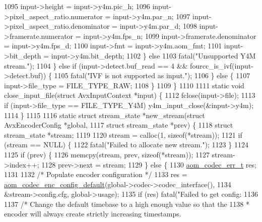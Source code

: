 \begin{DoxyCodeInclude}
{{{{{{{{{{{{{{{1095       input->height = input->y4m.pic\_h;
1096       input->pixel\_aspect\_ratio.numerator = input->y4m.par\_n;
1097       input->pixel\_aspect\_ratio.denominator = input->y4m.par\_d;
1098       input->framerate.numerator = input->y4m.fps\_n;
1099       input->framerate.denominator = input->y4m.fps\_d;
1100       input->fmt = input->y4m.aom\_fmt;
1101       input->bit\_depth = input->y4m.bit\_depth;
1102     \} \textcolor{keywordflow}{else}
1103       fatal(\textcolor{stringliteral}{"Unsupported Y4M stream."});
1104   \} \textcolor{keywordflow}{else} \textcolor{keywordflow}{if} (input->detect.buf\_read == 4 && fourcc\_is\_ivf(input->detect.buf)) \{
1105     fatal(\textcolor{stringliteral}{"IVF is not supported as input."});
1106   \} \textcolor{keywordflow}{else} \{
1107     input->file\_type = FILE\_TYPE\_RAW;
1108   \}
1109 \}
1110 
1111 \textcolor{keyword}{static} \textcolor{keywordtype}{void} close\_input\_file(\textcolor{keyword}{struct} AvxInputContext *input) \{
1112   fclose(input->file);
1113   \textcolor{keywordflow}{if} (input->file\_type == FILE\_TYPE\_Y4M) y4m\_input\_close(&input->y4m);
1114 \}
1115 
1116 \textcolor{keyword}{static} \textcolor{keyword}{struct }stream\_state *new\_stream(\textcolor{keyword}{struct} AvxEncoderConfig *global,
1117     \textcolor{keyword}{struct} stream\_state *prev) \{
1118   \textcolor{keyword}{struct }stream\_state *stream;
1119 
1120   stream = calloc(1, \textcolor{keyword}{sizeof}(*stream));
1121   \textcolor{keywordflow}{if} (stream == NULL) \{
1122     fatal(\textcolor{stringliteral}{"Failed to allocate new stream."});
1123   \}
1124 
1125   \textcolor{keywordflow}{if} (prev) \{
1126     memcpy(stream, prev, \textcolor{keyword}{sizeof}(*stream));
1127     stream->index++;
1128     prev->next = stream;
1129   \} \textcolor{keywordflow}{else} \{
1130     \hyperlink{group__codec_gaaae61e0f8663e6137f1e228757248e7c}{aom\_codec\_err\_t} res;
1131 
1132     \textcolor{comment}{/* Populate encoder configuration */}
1133     res = \hyperlink{group__encoder_gabe456ab6f99bdebc47018779b75d2521}{aom\_codec\_enc\_config\_default}(global->codec->codec\_interface(),
1134         &stream->config.cfg, global->usage);
1135     \textcolor{keywordflow}{if} (res) fatal(\textcolor{stringliteral}{"Failed to get config: %
1136 
1137     \textcolor{comment}{/* Change the default timebase to a high enough value so that the}
1138 \textcolor{comment}{     * encoder will always create strictly increasing timestamps.}
}}}}}}}}}}}}}}}}
\end{DoxyCodeInclude}
